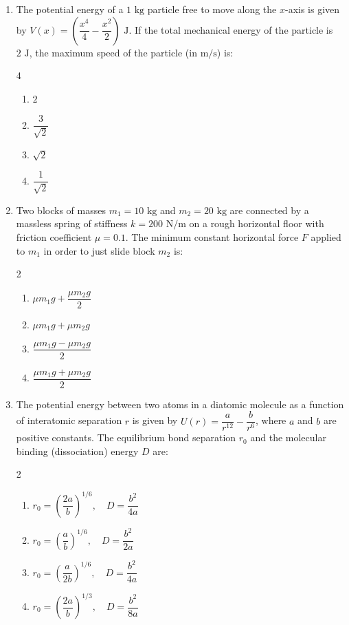 \documentclass[11pt,a4paper]{article}
\begin{document}
\begin{enumerate}[label=\textbf{\arabic*.},leftmargin=18pt,itemsep=8pt,resume]
  \item The potential energy of a $1\text{ kg}$ particle free to move along the $x$-axis is given by $V(x) = \left(\dfrac{x^4}{4} - \dfrac{x^2}{2}\right)\text{ J}$. If the total mechanical energy of the particle is $2\text{ J}$, the maximum speed of the particle (in $\text{m/s}$) is:
  \begin{multicols}{4}
    \begin{enumerate}[label=(\Alph*)]
      \item $2$
      \item $\dfrac{3}{\sqrt{2}}$
      \item $\sqrt{2}$
      \item $\dfrac{1}{\sqrt{2}}$
    \end{enumerate}
  \end{multicols}

  \item Two blocks of masses $m_1 = 10\text{ kg}$ and $m_2 = 20\text{ kg}$ are connected by a massless spring of stiffness $k = 200\text{ N/m}$ on a rough horizontal floor with friction coefficient $\mu = 0.1$. The minimum constant horizontal force $F$ applied to $m_1$ in order to just slide block $m_2$ is:
  \begin{multicols}{2}
    \begin{enumerate}[label=(\Alph*)]
      \item $\mu m_1 g + \dfrac{\mu m_2 g}{2}$
      \item $\mu m_1 g + \mu m_2 g$
      \item $\dfrac{\mu m_1 g - \mu m_2 g}{2}$
      \item $\dfrac{\mu m_1 g + \mu m_2 g}{2}$
    \end{enumerate}
  \end{multicols}

  \item The potential energy between two atoms in a diatomic molecule as a function of interatomic separation $r$ is given by $U(r) = \dfrac{a}{r^{12}} - \dfrac{b}{r^6}$, where $a$ and $b$ are positive constants. The equilibrium bond separation $r_0$ and the molecular binding (dissociation) energy $D$ are:
  \begin{multicols}{2}
    \begin{enumerate}[label=(\Alph*)]
      \item $r_0 = \left(\dfrac{2a}{b}\right)^{1/6}, \quad D = \dfrac{b^2}{4a}$
      \item $r_0 = \left(\dfrac{a}{b}\right)^{1/6}, \quad D = \dfrac{b^2}{2a}$
      \item $r_0 = \left(\dfrac{a}{2b}\right)^{1/6}, \quad D = \dfrac{b^2}{4a}$
      \item $r_0 = \left(\dfrac{2a}{b}\right)^{1/3}, \quad D = \dfrac{b^2}{8a}$
    \end{enumerate}
  \end{multicols}


\end{enumerate}
\end{document}

